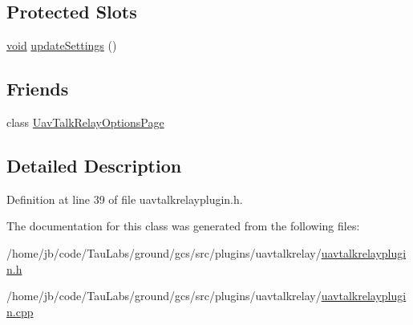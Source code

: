 \subsection*{\-Protected \-Slots}
\begin{DoxyCompactItemize}
\item 
\hyperlink{group___u_a_v_objects_plugin_ga444cf2ff3f0ecbe028adce838d373f5c}{void} \hyperlink{group___u_a_v_talk_gac6522ac462e3ef789bccecdf33e38779}{update\-Settings} ()
\end{DoxyCompactItemize}
\subsection*{\-Friends}
\begin{DoxyCompactItemize}
\item 
class \hyperlink{group___u_a_v_talk_gaf20a0868107dbd85408f5bcba4e98063}{\-Uav\-Talk\-Relay\-Options\-Page}
\end{DoxyCompactItemize}


\subsection{\-Detailed \-Description}


\-Definition at line 39 of file uavtalkrelayplugin.\-h.



\-The documentation for this class was generated from the following files\-:\begin{DoxyCompactItemize}
\item 
/home/jb/code/\-Tau\-Labs/ground/gcs/src/plugins/uavtalkrelay/\hyperlink{uavtalkrelayplugin_8h}{uavtalkrelayplugin.\-h}\item 
/home/jb/code/\-Tau\-Labs/ground/gcs/src/plugins/uavtalkrelay/\hyperlink{uavtalkrelayplugin_8cpp}{uavtalkrelayplugin.\-cpp}\end{DoxyCompactItemize}
